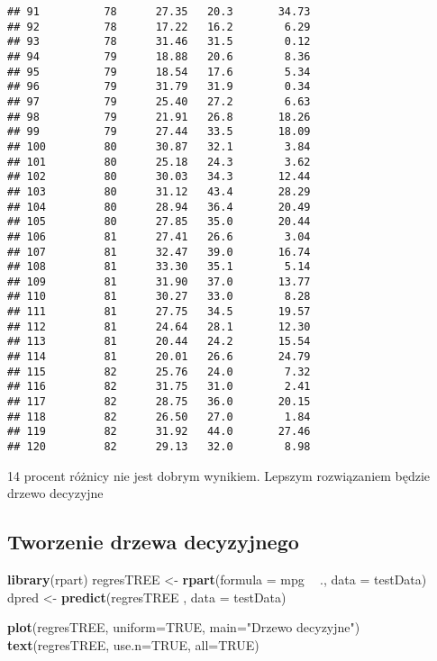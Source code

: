 \documentclass[
]{article}
\newenvironment{Shaded}{\begin{snugshade}}{\end{snugshade}}
\newcommand{\DataTypeTok}[1]{\textcolor[rgb]{0.13,0.29,0.53}{#1}}
\newcommand{\KeywordTok}[1]{\textcolor[rgb]{0.13,0.29,0.53}{\textbf{#1}}}
\newcommand{\NormalTok}[1]{#1}
\newcommand{\OperatorTok}[1]{\textcolor[rgb]{0.81,0.36,0.00}{\textbf{#1}}}
\newcommand{\OtherTok}[1]{\textcolor[rgb]{0.56,0.35,0.01}{#1}}
\newcommand{\StringTok}[1]{\textcolor[rgb]{0.31,0.60,0.02}{#1}}
\begin{document}
\begin{verbatim}
## 91          78      27.35   20.3       34.73
## 92          78      17.22   16.2        6.29
## 93          78      31.46   31.5        0.12
## 94          79      18.88   20.6        8.36
## 95          79      18.54   17.6        5.34
## 96          79      31.79   31.9        0.34
## 97          79      25.40   27.2        6.63
## 98          79      21.91   26.8       18.26
## 99          79      27.44   33.5       18.09
## 100         80      30.87   32.1        3.84
## 101         80      25.18   24.3        3.62
## 102         80      30.03   34.3       12.44
## 103         80      31.12   43.4       28.29
## 104         80      28.94   36.4       20.49
## 105         80      27.85   35.0       20.44
## 106         81      27.41   26.6        3.04
## 107         81      32.47   39.0       16.74
## 108         81      33.30   35.1        5.14
## 109         81      31.90   37.0       13.77
## 110         81      30.27   33.0        8.28
## 111         81      27.75   34.5       19.57
## 112         81      24.64   28.1       12.30
## 113         81      20.44   24.2       15.54
## 114         81      20.01   26.6       24.79
## 115         82      25.76   24.0        7.32
## 116         82      31.75   31.0        2.41
## 117         82      28.75   36.0       20.15
## 118         82      26.50   27.0        1.84
## 119         82      31.92   44.0       27.46
## 120         82      29.13   32.0        8.98
\end{verbatim}

14 procent różnicy nie jest dobrym wynikiem. Lepszym rozwiązaniem będzie
drzewo decyzyjne

\hypertarget{tworzenie-drzewa-decyzyjnego}{%
\subsection{Tworzenie drzewa
decyzyjnego}\label{tworzenie-drzewa-decyzyjnego}}

\begin{Shaded}
\begin{Highlighting}[]
\KeywordTok{library}\NormalTok{(rpart)}
\NormalTok{regresTREE <-}\StringTok{ }\KeywordTok{rpart}\NormalTok{(}\DataTypeTok{formula =}\NormalTok{ mpg }\OperatorTok{~}\StringTok{ }\NormalTok{., }\DataTypeTok{data =}\NormalTok{ testData)}
\NormalTok{dpred <-}\StringTok{ }\KeywordTok{predict}\NormalTok{(regresTREE , }\DataTypeTok{data =}\NormalTok{ testData)}

\KeywordTok{plot}\NormalTok{(regresTREE, }\DataTypeTok{uniform=}\OtherTok{TRUE}\NormalTok{, }\DataTypeTok{main=}\StringTok{"Drzewo decyzyjne"}\NormalTok{)}
\KeywordTok{text}\NormalTok{(regresTREE, }\DataTypeTok{use.n=}\OtherTok{TRUE}\NormalTok{, }\DataTypeTok{all=}\OtherTok{TRUE}\NormalTok{)}
\end{Highlighting}
\end{Shaded}
\end{document}
